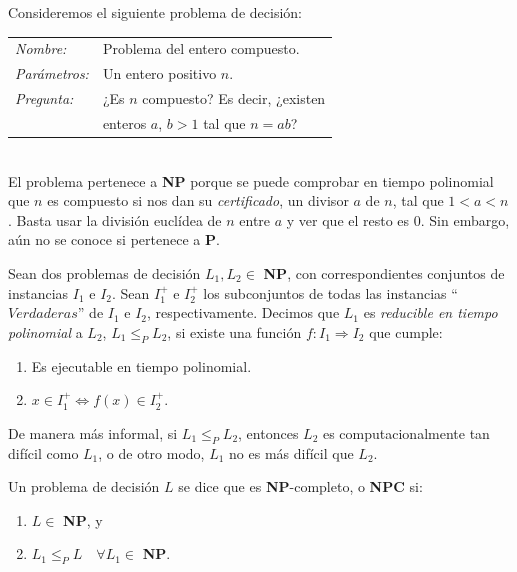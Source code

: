 \begin{example}
	Consideremos el siguiente problema de decisión:
	
		\begin{tabular}{|ll}
		\textit{Nombre:} & Problema del entero compuesto. \\
		\textit{Parámetros:} & Un entero positivo $n$. \\
		\textit{Pregunta:} & ¿Es $n$ compuesto? Es decir, ¿existen \\
			&  enteros $a$, $b > 1$ tal que $n=ab$? \\
	\end{tabular}
	\\
	
	El problema pertenece a \textbf{NP} porque se puede comprobar en tiempo polinomial que $n$ es compuesto si nos dan su \textit{certificado}, un divisor $a$ de $n$, tal que $1 < a < n$. Basta usar la división euclídea de $n$ entre $a$ y ver que el resto es $0$. Sin embargo, aún no se conoce si pertenece a \textbf{P}.
\end{example}


\hfil

\begin{definition}
	Sean dos problemas de decisión $L_1, L_2 \in $ \textbf{NP}, con correspondientes conjuntos de instancias $I_1$ e $I_2$. Sean $I_1^+$ e $I_2^+$ los subconjuntos de todas las instancias ``$Verdaderas$'' de $I_1$ e $I_2$, respectivamente. Decimos que $L_1$ es \textit{reducible en tiempo polinomial} a $L_2$, $L_1 \leq_P L_2$, si existe una función $f:I_1 \Rightarrow I_2$ que cumple:
	
	\begin{enumerate}
		\item Es ejecutable en tiempo polinomial.
		\item $x \in I_1^+  \Leftrightarrow  f(x) \in I_2^+ $.
	\end{enumerate}
\end{definition}

\hfil

De manera más informal, si $L_1 \leq_P L_2$, entonces $L_2$ es computacionalmente tan difícil como $L_1$, o de otro modo, $L_1$ no es más difícil que $L_2$.

\begin{definition}
	Un problema de decisión $L$ se dice que es \textbf{NP}-completo, o \textbf{NPC} si:
	\begin{enumerate}[label=(\roman*)]
		\item $L \in $ \textbf{NP}, y
		\item $L_1 \leq_P L \quad \forall L_1 \in $ \textbf{NP}.
	\end{enumerate}
\end{definition}

